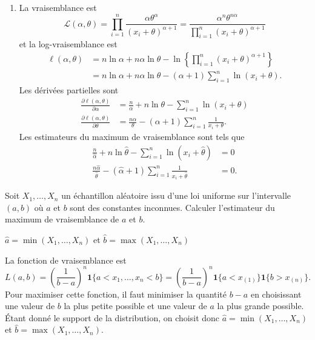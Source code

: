 \begin{exercice}
\begin{sol}
\begin{enumerate}
\item La vraisemblance est
$$
\mathcal{L}(\alpha,\theta)=\prod_{i=1}^n\frac{\alpha\theta^\alpha}{(x_i+\theta)^{\alpha+1}}=\frac{\alpha^n\theta^{n\alpha}}{\prod_{i=1}^n(x_i+\theta)^{\alpha+1}}
$$
et la log-vraisemblance est
\begin{align*}
\ell(\alpha,\theta)&=n\ln \alpha+n\alpha\ln \theta-\ln\left\{\prod_{i=1}^n(x_i+\theta)^{\alpha+1}\right\}\\
&=n\ln \alpha+n\alpha\ln \theta-(\alpha+1)\sum_{i=1}^n\ln(x_i+\theta).
\end{align*}
Les dérivées partielles sont
\begin{align*}
\frac{\partial\ell(\alpha,\theta)}{\partial \alpha}&=\frac{n}{ \alpha}+n\ln \theta-\sum_{i=1}^n\ln(x_i+\theta)\\
\frac{\partial\ell(\alpha,\theta)}{\partial \theta}&=\frac{n\alpha}{ \theta}-(\alpha+1)\sum_{i=1}^n\frac{1}{x_i+\theta}.
\end{align*}
Les estimateurs du maximum de vraisemblance sont tels que
\begin{align*}
\frac{n}{\hat\alpha}+n\ln \hat\theta-\sum_{i=1}^n\ln(x_i+\hat\theta)&=0\\
\frac{n\hat\alpha}{ \hat\theta}-(\hat\alpha+1)\sum_{i=1}^n\frac{1}{x_i+\hat\theta}&=0.
\end{align*}
\end{enumerate}
\end{sol}
\end{exercice}

\begin{exercice}
  Soit $X_1, \dots, X_n$ un échantillon aléatoire issu d'une loi
  uniforme sur l'intervalle $(a, b)$ où $a$ et $b$ sont des constantes
  inconnues. Calculer l'estimateur du maximum de vraisemblance de $a$
  et $b$.
  \begin{rep}
    $\hat{a} = \min(X_1, \dots, X_n)$ et $\hat{b} = \max(X_1, \dots,
    X_n)$
  \end{rep}
  \begin{sol}
    La fonction de vraisemblance est
    \begin{equation*}
      L(a, b) = \left( \frac{1}{b - a} \right)^n\mathbf{1}\{a < x_1, \dots, x_n < b\} = \left( \frac{1}{b - a} \right)^n\mathbf{1}\{a < x_{(1)}\} \mathbf{1}\{b > x_{(n)}\}.
    \end{equation*}
    Pour maximiser cette fonction, il
    faut minimiser la quantité $b - a$ en choisissant une valeur de
    $b$ la plus petite possible et une valeur de $a$ la plus grande
    possible. Étant donné le support de la distribution, on choisit
    donc $\hat{a} = \min(X_1, \dots, X_n)$ et $\hat{b} = \max(X_1,
    \dots, X_n)$.
  \end{sol}
\end{exercice}

